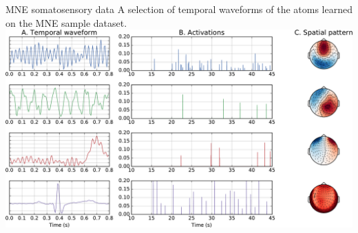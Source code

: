 \documentclass{beamer}
\begin{document}
\begin{frame}{MNE somatosensory data}
A selection of temporal waveforms of the atoms learned on the MNE sample dataset.\\[1em]
\centering
\includegraphics[width=0.99\linewidth]{atoms_sample.pdf}
\end{frame}
\end{document}
